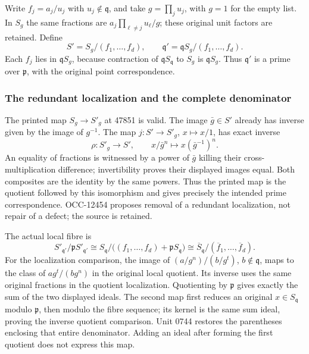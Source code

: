 Write \(f_j=a_j/u_j\) with \(u_j\notin\mathfrak q\), and take \(g=\prod_j u_j\), with \(g=1\) for the empty list. In \(S_g\) the same fractions are \(a_j\prod_{\ell\ne j}u_\ell/g\); these original unit factors are retained. Define \[
S'=S_g/(f_1,\ldots,f_d),\qquad
\mathfrak q'=\mathfrak qS_g/(f_1,\ldots,f_d).
\] Each \(f_j\) lies in \(\mathfrak qS_g\), because contraction of \(\mathfrak qS_{\mathfrak q}\) to \(S_g\) is \(\mathfrak qS_g\). Thus \(\mathfrak q'\) is a prime over \(\mathfrak p\), with the original point correspondence.

\subsubsection{The redundant localization and the complete denominator}\label{algebra-proof-073-the-redundant-localization-and-the-complete-denominator}

The printed map \(S_g\to S'_g\) at 47851 is valid. The image \(\bar g\in S'\) already has inverse given by the image of \(g^{-1}\). The map \(j:S'\to S'_g\), \(x\mapsto x/1\), has exact inverse \[
\rho:S'_g\longrightarrow S',\qquad x/\bar g^n\longmapsto x(\bar g^{-1})^n.
\] An equality of fractions is witnessed by a power of \(\bar g\) killing their cross-multiplication difference; invertibility proves their displayed images equal. Both composites are the identity by the same powers. Thus the printed map is the quotient followed by this isomorphism and gives precisely the intended prime correspondence. OCC-12454 proposes removal of a redundant localization, not repair of a defect; the source is retained.

The actual local fibre is \[
S'_{\mathfrak q'}/\mathfrak pS'_{\mathfrak q'}
\cong S_{\mathfrak q}/\big((f_1,\ldots,f_d)+\mathfrak pS_{\mathfrak q}\big)
\cong\overline S_{\mathfrak q}/(\overline f_1,\ldots,\overline f_d).
\] For the localization comparison, the image of \((a/g^n)/(b/g^t)\), \(b\notin\mathfrak q\), maps to the class of \(ag^t/(bg^n)\) in the original local quotient. Its inverse uses the same original fractions in the quotient localization. Quotienting by \(\mathfrak p\) gives exactly the sum of the two displayed ideals. The second map first reduces an original \(x\in S_{\mathfrak q}\) modulo \(\mathfrak p\), then modulo the fibre sequence; its kernel is the same sum ideal, proving the inverse quotient comparison. Unit 0744 restores the parentheses enclosing that entire denominator. Adding an ideal after forming the first quotient does not express this map.

